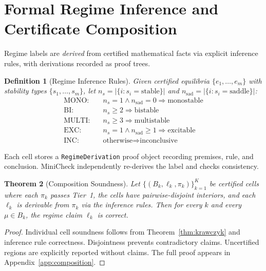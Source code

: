 \documentclass[11pt]{article}
\newtheorem{theorem}{Theorem}
\newtheorem{definition}[theorem]{Definition}
\begin{document}
\section{Formal Regime Inference and Certificate Composition}
\label{sec:regime}

Regime labels are \emph{derived} from certified mathematical facts via explicit inference rules, with derivations recorded as proof trees.

\begin{definition}[Regime Inference Rules]
\label{def:regime}
Given certified equilibria $\{e_1, \ldots, e_m\}$ with stability types $\{s_1, \ldots, s_m\}$, let $n_s = |\{i : s_i = \text{stable}\}|$ and $n_{\mathrm{sad}} = |\{i : s_i = \text{saddle}\}|$:
\begin{align*}
\text{MONO:}  &\quad n_s = 1 \wedge n_{\mathrm{sad}} = 0 \Rightarrow \text{monostable} \\
\text{BI:}    &\quad n_s \geq 2 \Rightarrow \text{bistable} \\
\text{MULTI:} &\quad n_s \geq 3 \Rightarrow \text{multistable} \\
\text{EXC:}   &\quad n_s = 1 \wedge n_{\mathrm{sad}} \geq 1 \Rightarrow \text{excitable} \\
\text{INC:}   &\quad \text{otherwise} \Rightarrow \text{inconclusive}
\end{align*}
\end{definition}

Each cell stores a \texttt{RegimeDerivation} proof object recording premises, rule, and conclusion.  MiniCheck independently re-derives the label and checks consistency.

\label{sec:composition}

\begin{theorem}[Composition Soundness]
\label{thm:composition}
Let $\{(B_k, \ell_k, \pi_k)\}_{k=1}^K$ be certified cells where each $\pi_k$ passes Tier~1, the cells have pairwise-disjoint interiors, and each $\ell_k$ is derivable from $\pi_k$ via the inference rules.
Then for every $k$ and every $\mu \in B_k$, the regime claim $\ell_k$ is correct.
\end{theorem}

\begin{proof}
Individual cell soundness follows from Theorem~\ref{thm:krawczyk} and inference rule correctness.
Disjointness prevents contradictory claims.
Uncertified regions are explicitly reported without claims.
The full proof appears in Appendix~\ref{app:composition}.
\end{proof}
\end{document}
